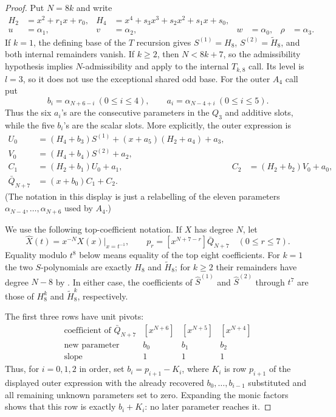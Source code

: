 \begin{proof}
    Put $N=8k$ and write
    \[
      \begin{aligned}
      H_2&=x^2+r_1x+r_0,&
      H_4&=x^4+s_3x^3+s_2x^2+s_1x+s_0,\\
      u&=\alpha_1,&v&=\alpha_2,&w&=\alpha_0,&\rho&=\alpha_3.
      \end{aligned}
    \]
    If $k=1$, the defining base of the $T$ recursion gives
    $S^{(1)}=H_8$, $S^{(2)}=\widetilde H_8$, and both internal remainders
    vanish.  If $k\ge2$, then $N<8k+7$, so the admissibility hypothesis
    implies $N$-admissibility and
     apply to the internal $T_{k,8}$
    call.  Its level is $l=3$, so it does not use the exceptional shared odd
    base.
    For the outer $A_4$ call put
    \[
      b_i=\alpha_{N+6-i}\ (0\le i\le4),\qquad
      a_i=\alpha_{N-4+i}\ (0\le i\le5).
    \]
    Thus the six $a_i$'s are the consecutive parameters in the $Q_3$ and
    additive slots, while the five $b_i$'s are the scalar slots.  More
    explicitly, the outer expression is
    \[
    \begin{aligned}
      U_0&=(H_4+b_3)S^{(1)}+(x+a_5)(H_2+a_4)+a_3,\\
      V_0&=(H_4+b_4)S^{(2)}+a_2,\\
      C_1&=(H_2+b_1)U_0+a_1,
      &C_2&=(H_2+b_2)V_0+a_0,\\
      \bar Q_{N+7}&=(x+b_0)C_1+C_2.
    \end{aligned}
    \]
    (The notation in this display is just a relabelling of the eleven
    parameters $\alpha_{N-4},\ldots,\alpha_{N+6}$ used by $A_4$.)

    We use the following top-coefficient notation.  If $X$ has degree $N$, let
    \[
      \widehat X(t)=x^{-N}X(x)\big|_{x=t^{-1}},
      \qquad
      p_r=[x^{N+7-r}]\bar Q_{N+7}\quad(0\le r\le7).
    \]
    Equality modulo $t^8$ below means equality of the top eight coefficients.
    For $k=1$ the two $S$-polynomials are exactly $H_8$ and
    $\widetilde H_8$; for $k\ge2$ their remainders have degree $N-8$ by
    .  In either case, the coefficients of
    $\widehat S^{(1)}$ and $\widehat S^{(2)}$ through $t^7$ are those of
    $H_8^k$ and $\widetilde H_8^k$, respectively.

    The first three rows have unit pivots:
    \[
      \begin{array}{c|ccc}
        \text{coefficient of }\bar Q_{N+7}&[x^{N+6}]&[x^{N+5}]&[x^{N+4}]\\ \hline
        \text{new parameter}&b_0&b_1&b_2\\
        \text{slope}&1&1&1
      \end{array}
    \]
    Thus, for $i=0,1,2$ in order, set $b_i=p_{i+1}-K_i$, where $K_i$
    is row $p_{i+1}$ of the displayed outer expression with the already
    recovered $b_0,\ldots,b_{i-1}$ substituted and all remaining unknown
    parameters set to zero.  Expanding the monic factors shows that this
    row is exactly $b_i+K_i$: no later parameter reaches it.


\end{proof}
